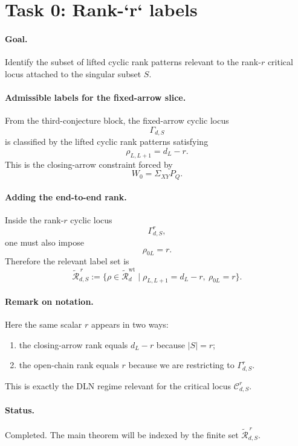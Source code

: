 \section*{Task 0: Rank-`r` labels}

\paragraph{Goal.}
Identify the subset of lifted cyclic rank patterns relevant to the rank-\(r\)
critical locus attached to the singular subset \(S\).

\paragraph{Admissible labels for the fixed-arrow slice.}
From the third-conjecture block, the fixed-arrow cyclic locus
\[
\Gamma_{d,S}
\]
is classified by the lifted cyclic rank patterns satisfying
\[
\rho_{L,L+1}=d_L-r.
\]
This is the closing-arrow constraint forced by
\[
W_0=\Sigma_{XY}P_Q.
\]

\paragraph{Adding the end-to-end rank.}
Inside the rank-\(r\) cyclic locus
\[
\Gamma_{d,S}^r,
\]
one must also impose
\[
\rho_{0L}=r.
\]
Therefore the relevant label set is
\[
\widetilde{\mathcal R}_{d,S}^{\,r}
:=
\{\rho\in \widetilde{\mathcal R}_d^{\mathrm{wt}}
\mid
\rho_{L,L+1}=d_L-r,\ \rho_{0L}=r\}.
\]

\paragraph{Remark on notation.}
Here the same scalar \(r\) appears in two ways:
\begin{enumerate}
\item the closing-arrow rank equals \(d_L-r\) because \(|S|=r\);
\item the open-chain rank equals \(r\) because we are restricting to
  \(\Gamma_{d,S}^r\).
\end{enumerate}
This is exactly the DLN regime relevant for the critical locus
\(\mathcal C_{d,S}^r\).

\paragraph{Status.}
Completed. The main theorem will be indexed by the finite set
\(\widetilde{\mathcal R}_{d,S}^{\,r}\).
